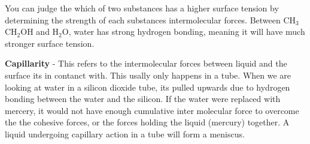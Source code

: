\documentclass{article}
\begin{document}
\noindent You can judge the which of two substances has a higher surface tension  by determining the strength of each substances intermolecular forces. Between CH$_3$CH$_2$OH and H$_2$O, water has strong hydrogen bonding, meaning it will have much stronger surface tension.\\
\begin{minipage}{9.5cm}
	\textbf{Capillarity} - This refers to the intermolecular forces between liquid and the surface its in contanct with. This usally only happens in a tube. When we are looking at water in a silicon dioxide tube, its pulled upwards due to hydrogen bonding between the water and the silicon. If the water were replaced with mercery, it would not have enough cumulative inter molecular force to overcome the the cohesive forces, or the forces holding the liquid (mercury) together. A liquid undergoing capillary action in a tube will form a meniscus.

\end{minipage}
\end{document}
